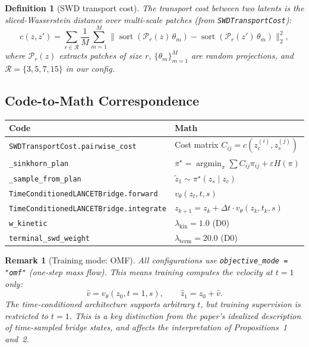 \documentclass[letterpaper]{article}
\newtheorem{definition}[proposition]{Definition}
\newtheorem{remark}[proposition]{Remark}
\newcommand{\cP}{\mathcal{P}}
\newcommand{\argmin}{\operatorname{argmin}}
\newcommand{\sort}{\operatorname{sort}}
\begin{document}
\begin{definition}[SWD transport cost]
\label{def:swd_cost}
The transport cost between two latents is the sliced-Wasserstein distance
over multi-scale patches (from \texttt{SWDTransportCost}):
\begin{equation}
    c(z, z') = \sum_{r\in\mathcal{R}} \frac{1}{M}\sum_{m=1}^M
    \bigl\| \sort(\cP_r(z)\,\theta_m) - \sort(\cP_r(z')\,\theta_m) \bigr\|_2^2,
\end{equation}
where $\cP_r(z)$ extracts patches of size $r$, $\{\theta_m\}_{m=1}^M$ are
random projections, and $\mathcal{R}=\{3,5,7,15\}$ in our config.
\end{definition}

\subsection{Code-to-Math Correspondence}

\begin{center}
\begin{tabular}{ll}
\toprule
\textbf{Code} & \textbf{Math} \\
\midrule
\texttt{SWDTransportCost.pairwise\_cost} & Cost matrix $C_{ij}=c(z_c^{(i)},z_s^{(j)})$ \\
\texttt{\_sinkhorn\_plan} & $\pi^\star = \argmin_\pi\sum C_{ij}\pi_{ij}+\varepsilon H(\pi)$ \\
\texttt{\_sample\_from\_plan} & $\tilde z_1\sim\pi^\star(z_s\mid z_c)$ \\
\texttt{TimeConditionedLANCETBridge.forward} & $v_\theta(z_t, t, s)$ \\
\texttt{TimeConditionedLANCETBridge.integrate} & $z_{k+1} = z_k + \Delta t \cdot v_\theta(z_k, t_k, s)$ \\
\texttt{w\_kinetic} & $\lambda_{\text{kin}}=1.0$ (D0) \\
\texttt{terminal\_swd\_weight} & $\lambda_{\text{term}}=20.0$ (D0) \\
\bottomrule
\end{tabular}
\end{center}

\begin{remark}[Training mode: OMF]
\label{rem:omf}
All configurations use \texttt{objective\_mode = "omf"} (one-step mass flow).
This means training computes the velocity at $t=1$ only:
\begin{equation}
    \hat v = v_\theta(z_0, t=1, s),\qquad
    \hat z_1 = z_0 + \hat v.
\end{equation}
The time-conditioned architecture supports arbitrary $t$, but training
supervision is restricted to $t=1$. This is a key distinction from the
paper's idealized description of time-sampled bridge states,
and affects the interpretation of Propositions~1 and~2.
\end{remark}
\end{document}
